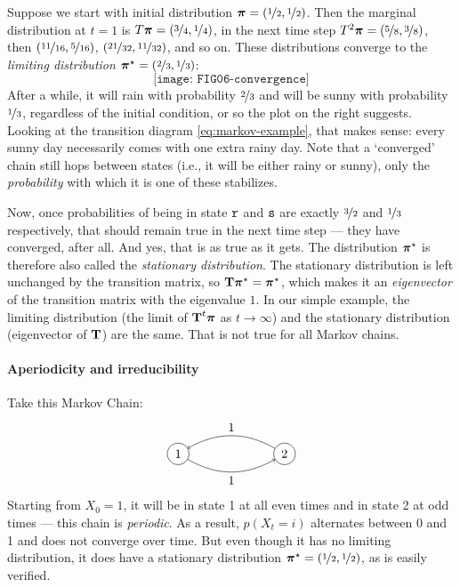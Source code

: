 \documentclass{../src/bcthesispart}
\begin{document}
Suppose we start with initial distribution $\boldsymbol{\mathbf{\pi}}=(\nicefrac{1}{2}, \nicefrac{1}{2})$.
Then the marginal distribution at $t=1$ is $T\boldsymbol{\mathbf{\pi}} = (\nicefrac{3}{4}, \nicefrac{1}{4})$, in the next time step $T^2\boldsymbol{\mathbf{\pi}} = (\nicefrac{5}{8}, \nicefrac{3}{8})$, then $(\nicefrac{11}{16}, \nicefrac{5}{16})$, $(\nicefrac{21}{32}, \nicefrac{11}{32})$, and so on. 
These distributions converge to the \emph{limiting distribution} $\boldsymbol{\mathbf{\pi}}^\star = (\nicefrac{2}{3}, \nicefrac{1}{3})$:
\begin{equation*}
\texttt{[image: FIG06-convergence]}
\end{equation*}
After a while, it will rain with probability $\nicefrac{2}{3}$ and will be sunny with probability $\nicefrac{1}{3}$, regardless of the initial condition, or so the plot on the right suggests. 
Looking at the transition diagram \ref{eq:markov-example}, that makes sense: every sunny day necessarily comes with one extra rainy day.
Note that a ‘converged’ chain still hops between states (i.e., it will be either rainy or sunny), only the \emph{probability} with which it is one of these stabilizes.




Now, once probabilities of being in state $\texttt{r}$ and $\texttt{s}$ are exactly $\nicefrac{3}{2}$ and $\nicefrac{1}{3}$ respectively, that should remain true in the next time step — they have converged, after all.
And yes, that is as true as it gets. 
The distribution $\boldsymbol{\mathbf{\pi}}^\star$ is therefore also called the \emph{stationary distribution}.
The stationary distribution is left unchanged by the transition matrix, so $\boldsymbol{\mathbf{T}} \boldsymbol{\mathbf{\pi}}^\star = \boldsymbol{\mathbf{\pi}}^\star$, which makes it an \emph{eigenvector} of the transition matrix with the eigenvalue $1$.
In our simple example, the limiting distribution (the limit of $\boldsymbol{\mathbf{T}}^t \boldsymbol{\mathbf{\pi}}$ as $t\to\infty$) and the stationary distribution (eigenvector of $\boldsymbol{\mathbf{T}}$) are the same. 
That is not true for all Markov chains.




\paragraph{Aperiodicity and irreducibility}

Take this Markov Chain:
\begin{equation*}
	\begin{tikzpicture}
		\tikzstyle{line node} = [draw, fill=white, font=\footnotesize ]
	    \node[shape=circle,draw=black] (1) at (0,0) {1};
	    \node[shape=circle,draw=black] (2) at (3,0) {2};
	    \path [->](1) edge[bend right] node[midway,below] {$1$} (2);
	    \path [->](2) edge[bend right] node[midway,above] {$1$} (1);
	\end{tikzpicture}
\end{equation*}
Starting from $X_0=1$, it will be in state 1 at all even times and in state 2 at odd times — this chain is \emph{periodic}.
As a result, $p(X_t = i)$ alternates between 0 and 1 and does not converge over time.
But even though it has no limiting distribution, it does have a stationary distribution $\boldsymbol{\mathbf{\pi}}^\star = (\nicefrac{1}{2}, \nicefrac{1}{2})$, as is easily verified.
\end{document}
